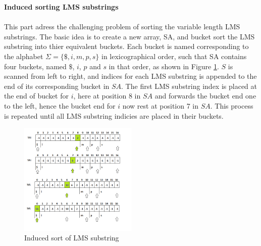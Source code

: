 \documentclass[12pt]{article} %
\begin{document}
\textbf{Induced sorting LMS substrings}
\\ \\
This part adress the challenging problem of sorting the variable length LMS substrings. The basic idea is to create a new array, SA, and bucket sort the LMS substring into thier equivalent buckets. Each bucket is named corresponding to the alphabet $\Sigma=\{\$,i,m,p,s\}$ in lexicographical order, such that SA contains four buckets, named $\$$, $i$, $p$ and $s$ in that order, as shown in Figure \ref{fig:SAIS_LMS}.
$S$ is scanned from left to right, and indices for each LMS substring is appended to the end of its corresponding bucket in $SA$. The first LMS substring index is placed at the end of bucket for $i$, here at position 8 in $SA$ and forwards the bucket end one to the left, hence the bucket end for $i$ now rest at position 7 in $SA$. This process is repeated until all LMS substring indicies are placed in their buckets.

\begin{figure}[H]
    \centering
    \includegraphics[width=0.5\textwidth]{SAIS_LMS}
    \captionsetup{width=0.8\textwidth}
    \caption{Induced sort of LMS substring}
    \label{fig:SAIS_LMS}
\end{figure}
\end{document}
